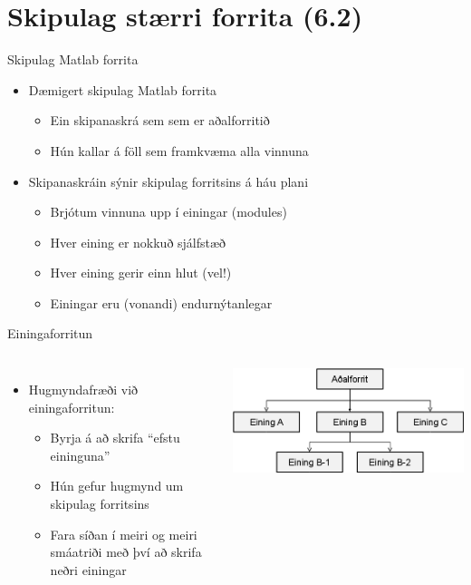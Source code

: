 \documentclass{beamer}
\begin{document}
\section{Skipulag stærri forrita (6.2)}

\begin{frame}{Skipulag Matlab forrita}
\begin{itemize}
 \item Dæmigert skipulag Matlab forrita
 \begin{itemize}
  \item Ein skipanaskrá sem sem er aðalforritið
  \item Hún kallar á föll sem framkvæma alla vinnuna
 \end{itemize}
 \item Skipanaskráin sýnir skipulag forritsins á háu plani
 \begin{itemize}
  \item Brjótum vinnuna upp í einingar (modules)
  \item Hver eining er nokkuð sjálfstæð
  \item Hver eining gerir einn hlut (vel!)
  \item Einingar eru (vonandi) endurnýtanlegar
 \end{itemize}
\end{itemize}
\end{frame}

\begin{frame}{Einingaforritun}
\begin{columns}
\begin{itemize}
 \item Hugmyndafræði við einingaforritun:
 \begin{itemize}
  \item Byrja á að skrifa ``efstu eininguna''
  \item Hún gefur hugmynd um skipulag forritsins
  \item Fara síðan í meiri og meiri smáatriði með því að skrifa neðri einingar
 \end{itemize}
\end{itemize}
\includegraphics[width=\linewidth]{Pics/organization}
\end{columns}
\end{frame}
\end{document}
